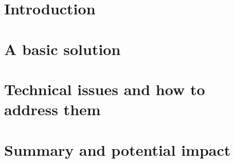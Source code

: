 \documentclass[conference]{IEEEtran}
\newcommand{\francisco}[1]{{\color{orange!40!olive}\textbf{Francisco: #1}}}
\begin{document}
\section{Introduction}
\label{sec:intro}



\section{A basic solution}
\label{sec:basic}



\section{Technical issues and how to address them}
\label{sec:tech}



\section{Summary and potential impact}
\label{sec:future}




\end{document}
